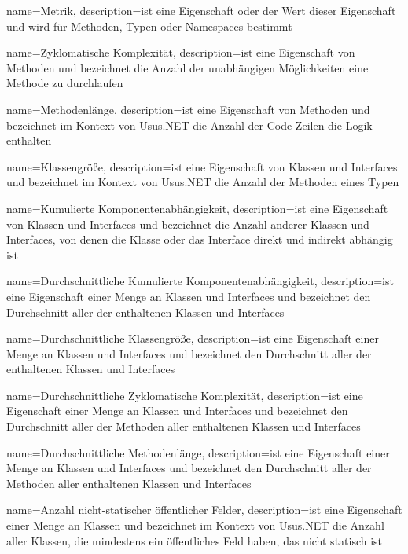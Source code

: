 {
   name={Metrik},
   description={ist eine Eigenschaft oder der Wert dieser Eigenschaft und wird f\"ur Methoden, Typen oder Namespaces bestimmt}
}

{
   name={Zyklomatische Komplexit\"at},
   description={ist eine Eigenschaft von Methoden und bezeichnet die Anzahl der unabh\"angigen M\"oglichkeiten eine Methode zu durchlaufen}
}

{
   name={Methodenl\"ange},
   description={ist eine Eigenschaft von Methoden und bezeichnet im Kontext von Usus.NET die Anzahl der Code-Zeilen die Logik enthalten}
}

{
   name={Klassengr\"o\ss e},
   description={ist eine Eigenschaft von Klassen und Interfaces und bezeichnet im Kontext von Usus.NET die Anzahl der Methoden eines Typen}
}

{
   name={Kumulierte Komponentenabh\"angigkeit},
   description={ist eine Eigenschaft von Klassen und Interfaces und bezeichnet die Anzahl anderer Klassen und Interfaces, von denen die Klasse oder das Interface direkt und indirekt abh\"angig ist}
}

{
   name={Durchschnittliche Kumulierte Komponentenabh\"angigkeit},
   description={ist eine Eigenschaft einer Menge an Klassen und Interfaces und bezeichnet den Durchschnitt aller  der enthaltenen Klassen und Interfaces}
}

{
   name={Durchschnittliche Klassengr\"o\ss e},
   description={ist eine Eigenschaft einer Menge an Klassen und Interfaces und bezeichnet den Durchschnitt aller  der enthaltenen Klassen und Interfaces}
}

{
   name={Durchschnittliche Zyklomatische Komplexit\"at},
   description={ist eine Eigenschaft einer Menge an Klassen und Interfaces und bezeichnet den Durchschnitt aller  der Methoden aller enthaltenen Klassen und Interfaces}
}

{
   name={Durchschnittliche Methodenl\"ange},
   description={ist eine Eigenschaft einer Menge an Klassen und Interfaces und bezeichnet den Durchschnitt aller  der Methoden aller enthaltenen Klassen und Interfaces}
}

{
   name={Anzahl nicht-statischer \"offentlicher Felder},
   description={ist eine Eigenschaft einer Menge an Klassen und bezeichnet im Kontext von Usus.NET die Anzahl aller Klassen, die mindestens ein \"offentliches Feld haben, das nicht statisch ist}
}

